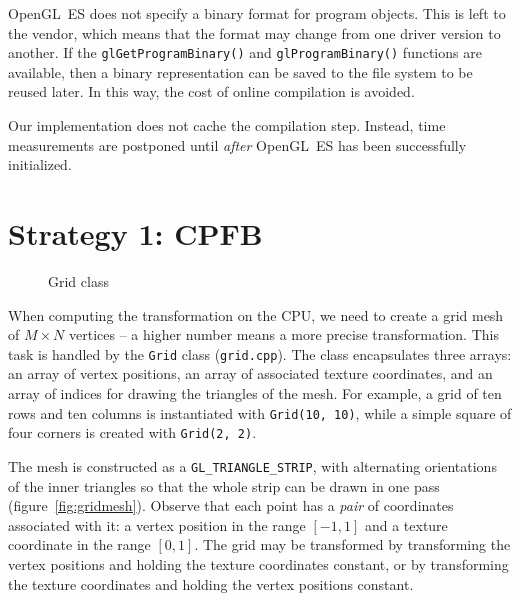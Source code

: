 \documentclass[english,12pt]{ifimaster}
\begin{document}
OpenGL~ES does not specify a binary format for program objects. This
is left to the vendor, which means that the format may change from one
driver version to another. If the \lstinline|glGetProgramBinary()| and
\lstinline|glProgramBinary()| functions are available, then a binary
representation can be saved to the file system to be reused later. In
this way, the cost of online compilation is avoided.

Our implementation does not cache the compilation step. Instead, time
measurements are postponed until \emph{after} OpenGL~ES has been
successfully initialized.

\section{Strategy 1: CPFB}


\begin{figure}[b]
  \centering
  \quad{}

  \caption{Grid class}
  \label{fig:grid}
\end{figure}

When computing the transformation on the CPU, we need to create a grid
mesh of $M \times N$ vertices -- a higher number means a more precise
transformation. This task is handled by the \lstinline|Grid| class
(\lstinline|grid.cpp|). The class encapsulates three arrays: an array
of vertex positions, an array of associated texture coordinates, and
an array of indices for drawing the triangles of the mesh. For
example, a grid of ten rows and ten columns is instantiated with
\lstinline|Grid(10, 10)|, while a simple square of four corners is
created with \lstinline|Grid(2, 2)|.

The mesh is constructed as a \lstinline|GL_TRIANGLE_STRIP|, with
alternating orientations of the inner triangles so that the whole
strip can be drawn in one pass (figure~\ref{fig:gridmesh}). Observe
that each point has a \emph{pair} of coordinates associated with it: a
vertex position in the range $[-1, 1]$ and a texture coordinate in the
range $[0, 1]$. The grid may be transformed by transforming the vertex
positions and holding the texture coordinates constant, or by
transforming the texture coordinates and holding the vertex positions
constant.
\end{document}
